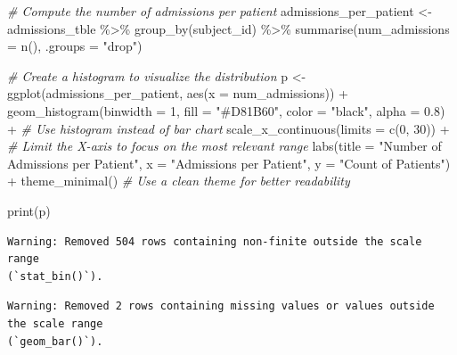 \documentclass[
]{article}
\newenvironment{Shaded}{\begin{snugshade}}{\end{snugshade}}
\newcommand{\AttributeTok}[1]{\textcolor[rgb]{0.77,0.63,0.00}{#1}}
\newcommand{\CommentTok}[1]{\textcolor[rgb]{0.56,0.35,0.01}{\textit{#1}}}
\newcommand{\DecValTok}[1]{\textcolor[rgb]{0.00,0.00,0.81}{#1}}
\newcommand{\FloatTok}[1]{\textcolor[rgb]{0.00,0.00,0.81}{#1}}
\newcommand{\FunctionTok}[1]{\textcolor[rgb]{0.00,0.00,0.00}{#1}}
\newcommand{\NormalTok}[1]{\textcolor[rgb]{0.00,0.00,0.00}{#1}}
\newcommand{\OtherTok}[1]{\textcolor[rgb]{0.56,0.35,0.01}{#1}}
\newcommand{\SpecialCharTok}[1]{\textcolor[rgb]{0.00,0.00,0.00}{#1}}
\newcommand{\StringTok}[1]{\textcolor[rgb]{0.31,0.60,0.02}{#1}}
\begin{document}
\begin{Shaded}
\begin{Highlighting}[]
\CommentTok{\# Compute the number of admissions per patient}
\NormalTok{admissions\_per\_patient }\OtherTok{\textless{}{-}}\NormalTok{ admissions\_tble }\SpecialCharTok{\%\textgreater{}\%}
  \FunctionTok{group\_by}\NormalTok{(subject\_id) }\SpecialCharTok{\%\textgreater{}\%}
  \FunctionTok{summarise}\NormalTok{(}\AttributeTok{num\_admissions =} \FunctionTok{n}\NormalTok{(), }\AttributeTok{.groups =} \StringTok{"drop"}\NormalTok{)}

\CommentTok{\# Create a histogram to visualize the distribution}
\NormalTok{p }\OtherTok{\textless{}{-}} \FunctionTok{ggplot}\NormalTok{(admissions\_per\_patient, }\FunctionTok{aes}\NormalTok{(}\AttributeTok{x =}\NormalTok{ num\_admissions)) }\SpecialCharTok{+}
  \FunctionTok{geom\_histogram}\NormalTok{(}\AttributeTok{binwidth =} \DecValTok{1}\NormalTok{, }\AttributeTok{fill =} \StringTok{"\#D81B60"}\NormalTok{, }
                 \AttributeTok{color =} \StringTok{"black"}\NormalTok{, }\AttributeTok{alpha =} \FloatTok{0.8}\NormalTok{) }\SpecialCharTok{+} 
                  \CommentTok{\# Use histogram instead of bar chart}
  \FunctionTok{scale\_x\_continuous}\NormalTok{(}\AttributeTok{limits =} \FunctionTok{c}\NormalTok{(}\DecValTok{0}\NormalTok{, }\DecValTok{30}\NormalTok{)) }\SpecialCharTok{+}  
  \CommentTok{\# Limit the X{-}axis to focus on the most relevant range}
  \FunctionTok{labs}\NormalTok{(}\AttributeTok{title =} \StringTok{"Number of Admissions per Patient"}\NormalTok{,}
       \AttributeTok{x =} \StringTok{"Admissions per Patient"}\NormalTok{,}
       \AttributeTok{y =} \StringTok{"Count of Patients"}\NormalTok{) }\SpecialCharTok{+}
  \FunctionTok{theme\_minimal}\NormalTok{()  }\CommentTok{\# Use a clean theme for better readability}

\FunctionTok{print}\NormalTok{(p)}
\end{Highlighting}
\end{Shaded}

\begin{verbatim}
Warning: Removed 504 rows containing non-finite outside the scale range
(`stat_bin()`).
\end{verbatim}

\begin{verbatim}
Warning: Removed 2 rows containing missing values or values outside the scale range
(`geom_bar()`).
\end{verbatim}
\end{document}
